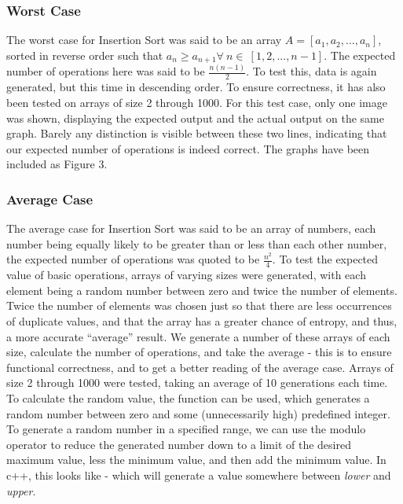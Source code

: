 \documentclass{article}
\begin{document}
        \subsubsection{Worst Case}
            The worst case for Insertion Sort was said to be an array $A = [a_1, a_2, ..., a_n]$, sorted in reverse order such that $a_n \geq a_{n+1} \forall\ n \in\ [1, 2, ..., n - 1]$. The expected number of operations here was said to be $\frac{n(n - 1)}{2}$. To test this, data is again generated, but this time in descending order. To ensure correctness, it has also been tested on arrays of size 2 through 1000. For this test case, only one image was shown, displaying the expected output and the actual output on the same graph. Barely any distinction is visible between these two lines, indicating that our expected number of operations is indeed correct. The graphs have been included as Figure 3.

        \subsubsection{Average Case}
            The average case for Insertion Sort was said to be an array of numbers, each number being equally likely to be greater than or less than each other number, the expected number of operations was quoted to be $\frac{n^2}{4}$. To test the expected value of basic operations, arrays of varying sizes were generated, with each element being a random number between zero and twice the number of elements. Twice the number of elements was chosen just so that there are less occurrences of duplicate values, and that the array has a greater chance of entropy, and thus, a more accurate ``average'' result. We generate a number of these arrays of each size, calculate the number of operations, and take the average - this is to ensure functional correctness, and to get a better reading of the average case. Arrays of size 2 through 1000 were tested, taking an average of 10 generations each time.\\

            To calculate the random value, the  function can be used, which generates a random number between zero and some (unnecessarily high) predefined integer. To generate a random number in a specified range, we can use the modulo operator to reduce the generated number down to a limit of the desired maximum value, less the minimum value, and then add the minimum value. In c++, this looks like  - which will generate a value somewhere between \textit{lower} and \textit{upper}.\\
\end{document}
